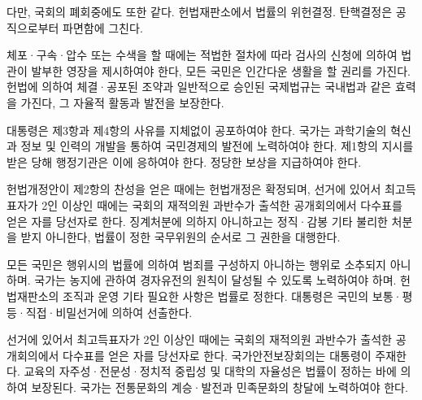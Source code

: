 \begin{CJK}{UTF8}{}
다만, 국회의 폐회중에도 또한 같다. 헌법재판소에서 법률의 위헌결정. 탄핵결정은
공직으로부터 파면함에 그친다.

체포·구속·압수 또는 수색을 할 때에는 적법한 절차에 따라 검사의 신청에 의하여
법관이 발부한 영장을 제시하여야 한다, 모든 국민은 인간다운 생활을 할 권리를
가진다. 헌법에 의하여 체결·공포된 조약과 일반적으로 승인된 국제법규는 국내법과
같은 효력을 가진다, 그 자율적 활동과 발전을 보장한다.

대통령은 제3항과 제4항의 사유를 지체없이 공포하여야 한다. 국가는 과학기술의
혁신과 정보 및 인력의 개발을 통하여 국민경제의 발전에 노력하여야 한다. 제1항의
지시를 받은 당해 행정기관은 이에 응하여야 한다. 정당한 보상을 지급하여야 한다.

헌법개정안이 제2항의 찬성을 얻은 때에는 헌법개정은 확정되며, 선거에 있어서
최고득표자가 2인 이상인 때에는 국회의 재적의원 과반수가 출석한 공개회의에서
다수표를 얻은 자를 당선자로 한다. 징계처분에 의하지 아니하고는 정직·감봉 기타
불리한 처분을 받지 아니한다, 법률이 정한 국무위원의 순서로 그 권한을 대행한다.

모든 국민은 행위시의 법률에 의하여 범죄를 구성하지 아니하는 행위로 소추되지
아니하며. 국가는 농지에 관하여 경자유전의 원칙이 달성될 수 있도록 노력하여야
하며. 헌법재판소의 조직과 운영 기타 필요한 사항은 법률로 정한다. 대통령은 국민의
보통·평등·직접·비밀선거에 의하여 선출한다.

선거에 있어서 최고득표자가 2인 이상인 때에는 국회의 재적의원 과반수가 출석한
공개회의에서 다수표를 얻은 자를 당선자로 한다. 국가안전보장회의는 대통령이
주재한다. 교육의 자주성·전문성·정치적 중립성 및 대학의 자율성은 법률이 정하는
바에 의하여 보장된다. 국가는 전통문화의 계승·발전과 민족문화의 창달에 노력하여야
한다.


\end{CJK}
\sectionend



